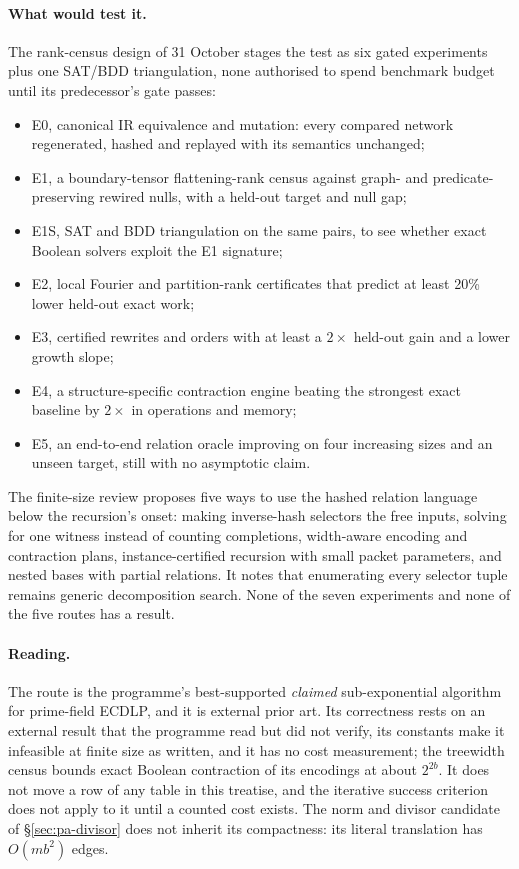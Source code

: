 \paragraph{What would test it.} The rank-census design of 31 October
stages the test as six gated experiments plus one SAT/BDD triangulation,
none authorised to spend benchmark budget until its predecessor's gate
passes:
\begin{itemize}
\item E0, canonical IR equivalence and mutation: every compared network
  regenerated, hashed and replayed with its semantics unchanged;
\item E1, a boundary-tensor flattening-rank census against graph- and
  predicate-preserving rewired nulls, with a held-out target and null gap;
\item E1S, SAT and BDD triangulation on the same pairs, to see whether exact
  Boolean solvers exploit the E1 signature;
\item E2, local Fourier and partition-rank certificates that predict at
  least 20\% lower held-out exact work;
\item E3, certified rewrites and orders with at least a $2\times$ held-out
  gain and a lower growth slope;
\item E4, a structure-specific contraction engine beating the strongest
  exact baseline by $2\times$ in operations and memory;
\item E5, an end-to-end relation oracle improving on four increasing sizes
  and an unseen target, still with no asymptotic claim.
\end{itemize}
The finite-size review proposes five ways to use the hashed relation
language below the recursion's onset: making inverse-hash selectors the free
inputs, solving for one witness instead of counting completions,
width-aware encoding and contraction plans, instance-certified recursion
with small packet parameters, and nested bases with partial relations. It
notes that enumerating every selector tuple remains generic decomposition
search. None of the seven experiments and none of the five routes has a
result.

\paragraph{Reading.} The route is the programme's best-supported
\emph{claimed} sub-exponential algorithm for prime-field ECDLP, and it is
external prior art. Its correctness rests on an external result that the
programme read but did not verify, its constants make it infeasible at
finite size as written, and it has no cost measurement; the treewidth
census bounds exact Boolean contraction of its encodings at about $2^{2b}$.
It does not move a row
of any table in this treatise, and the iterative success criterion does not
apply to it until a counted cost exists. The norm and divisor candidate of
\S\ref{sec:pa-divisor} does not inherit its compactness: its literal
translation has $O(mb^2)$ edges.

